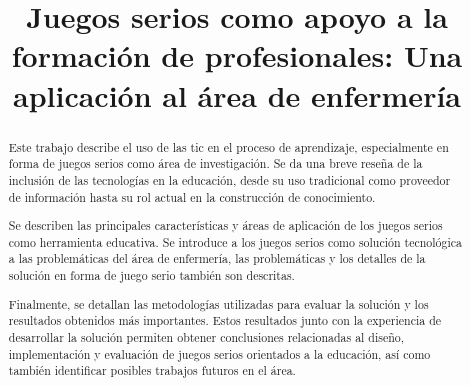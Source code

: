 \documentclass[conference]{util/IEEEtran}
\begin{document}



\title{Juegos serios como apoyo a la formación de profesionales: Una aplicación al área de enfermería}

\author{
\and
{}
}

\maketitle
\thispagestyle{plain}


\begin{abstract}

Este trabajo describe el uso de las \gls{tic} en el proceso de aprendizaje, especialmente en forma de juegos serios como área de investigación. Se da una breve reseña de la inclusión de las tecnologías en la educación, desde su uso tradicional como proveedor de información hasta su rol actual en la construcción de conocimiento. 

Se describen las principales características y áreas de aplicación de los juegos serios como herramienta educativa. Se introduce a los juegos serios como solución tecnológica a las problemáticas del área de enfermería, las problemáticas y los detalles de la solución en forma de juego serio también son descritas.

Finalmente, se detallan las metodologías utilizadas para evaluar la solución y
los resultados obtenidos más importantes. Estos resultados junto con la
experiencia de desarrollar la solución permiten obtener conclusiones
relacionadas al diseño, implementación y evaluación  de juegos serios orientados
a la educación, así como también identificar posibles trabajos futuros en el
área.


\end{abstract}
\end{document}
